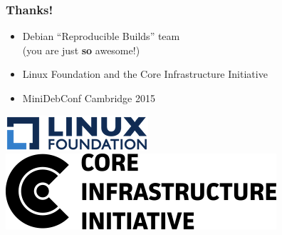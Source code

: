\documentclass[14pt]{beamer}
\begin{document}
\begin{frame}
 \frametitle{Thanks!}

 \begin{itemize}
  \item Debian “Reproducible Builds” team \\
        {\small (you are just \textbf{so} awesome!)}
  \item Linux Foundation and the Core Infrastructure Initiative
  \item MiniDebConf Cambridge 2015
\end{itemize}

 \begin{center}
  \includegraphics[height=0.1\paperheight]{images/linux_foundation_logo.png}
  \hspace{0.1\paperwidth}
  \includegraphics[height=0.1\paperheight]{images/cii_logo.png}
 \end{center}

 \vfill
 \begin{center}
 \end{center}
\end{frame}
\end{document}
